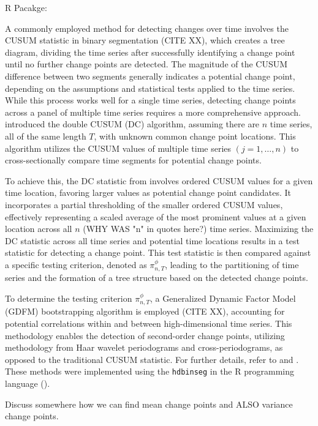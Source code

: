 \documentclass[USenglish]{article}
\theoremstyle{dgthm}
\theoremstyle{dgdef}
\begin{document}
R Pacakge: \cite{hdbinseg}

A commonly employed method for detecting changes over time involves the CUSUM statistic in binary segmentation (CITE XX), which creates a tree diagram, dividing the time series after successfully identifying a change point until no further change points are detected. The magnitude of the CUSUM difference between two segments generally indicates a potential change point, depending on the assumptions and statistical tests applied to the time series. While this process works well for a single time series, detecting change points across a panel of multiple time series requires a more comprehensive approach. \cite{Cho2016} introduced the double CUSUM (DC) algorithm, assuming there are $n$ time series, all of the same length $T$, with unknown common change point locations. This algorithm utilizes the CUSUM values of multiple time series $(j = 1, \dots, n)$ to cross-sectionally compare time segments for potential change points.

To achieve this, the DC statistic from \cite{Cho2016} involves ordered CUSUM values for a given time location, favoring larger values as potential change point candidates. It incorporates a partial thresholding of the smaller ordered CUSUM values, effectively representing a scaled average of the most prominent values at a given location across all $n$ (WHY WAS "n" in quotes here?) time series. Maximizing the DC statistic across all time series and potential time locations results in a test statistic for detecting a change point. This test statistic is then compared against a specific testing criterion, denoted as $\pi_{n,T}^\phi$, leading to the partitioning of time series and the formation of a tree structure based on the detected change points.

To determine the testing criterion $\pi_{n,T}^\phi$, a Generalized Dynamic Factor Model (GDFM) bootstrapping algorithm is employed (CITE XX), accounting for potential correlations within and between high-dimensional time series. This methodology enables the detection of second-order change points, utilizing methodology from \cite{ChoFryzlewicz2014} Haar wavelet periodograms and cross-periodograms, as opposed to the traditional CUSUM statistic. For further details, refer to \cite{Cho2016} and \cite{ChoFryzlewicz2014}.  These methods were implemented using the \texttt{hdbinseg} \cite{hdbinseg} in the R programming language (\cite{R2023language}).

Discuss somewhere how we can find mean change points and ALSO variance change points.  
\end{document}
